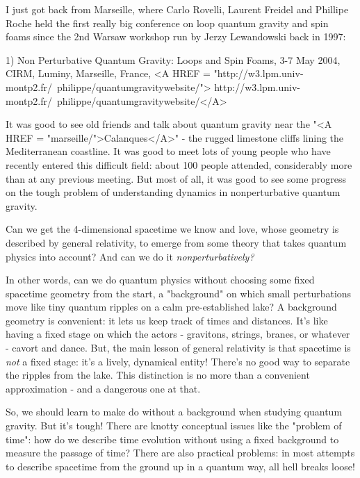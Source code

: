 


I just got back from Marseille, where Carlo Rovelli, Laurent Freidel
and Phillipe Roche held the first really big conference on loop quantum 
gravity and spin foams since the 2nd Warsaw workshop run by Jerzy 
Lewandowski back in 1997:

1) Non Perturbative Quantum Gravity: Loops and Spin Foams, 
3-7 May 2004, CIRM, Luminy, Marseille, France,
<A HREF = "http://w3.lpm.univ-montp2.fr/~philippe/quantumgravitywebsite/">
http://w3.lpm.univ-montp2.fr/~philippe/quantumgravitywebsite/</A>

It was good to see old friends and talk about quantum gravity near 
the "<A HREF = "marseille/">Calanques</A>" - 
the rugged limestone cliffs lining the Mediterranean 
coastline.   It was good to meet lots of young people who have recently 
entered this difficult field: about 100 people attended, considerably 
more than at any previous meeting.  But most of all, it was good to 
see some progress on the tough problem of understanding dynamics in 
nonperturbative quantum gravity.  

Can we get the 4-dimensional spacetime we know and love, whose geometry
is described by general relativity, to emerge from some theory that takes
quantum physics into account?  And can we do it \emph{nonperturbatively?}
 
In other words, can we do quantum physics without choosing some fixed 
spacetime geometry from the start, a "background" on which small 
perturbations move like tiny quantum ripples on a calm pre-established 
lake?  A background geometry is convenient: it lets us keep track of 
times and distances.  It's like having a fixed stage on which the actors - 
gravitons, strings, branes, or whatever - cavort and dance.  But, the 
main lesson of general relativity is that spacetime is \emph{not} a fixed 
stage: it's a lively, dynamical entity!   There's no good way to separate 
the ripples from the lake.  This distinction is no more than a convenient
approximation - and a dangerous one at that.

So, we should learn to make do without a background when studying quantum
gravity.  But it's tough!  There are knotty conceptual issues like the
"problem of time": how do we describe time evolution without 
using a fixed 
background to measure the passage of time?  There are also practical 
problems: in most attempts to describe spacetime from the ground up in 
a quantum way, all hell breaks loose!  

